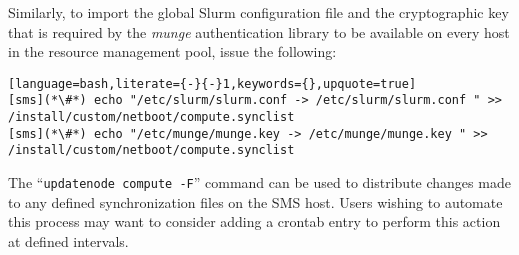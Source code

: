 \noindent Similarly, to import the global Slurm configuration file and the cryptographic
key that is required by the {\em munge} authentication library to be available
on every host in the resource management pool, issue the following:

\begin{lstlisting}[language=bash,literate={-}{-}1,keywords={},upquote=true]
[sms](*\#*) echo "/etc/slurm/slurm.conf -> /etc/slurm/slurm.conf " >> /install/custom/netboot/compute.synclist
[sms](*\#*) echo "/etc/munge/munge.key -> /etc/munge/munge.key " >> /install/custom/netboot/compute.synclist
\end{lstlisting}

\begin{center}
\begin{tcolorbox}[]
\small
The ``\texttt{updatenode compute -F}'' command can be used to distribute changes made to any
defined synchronization files on the SMS host. Users wishing to automate this process may
want to consider adding a crontab entry to perform this action at defined intervals.
\end{tcolorbox}
\end{center}
